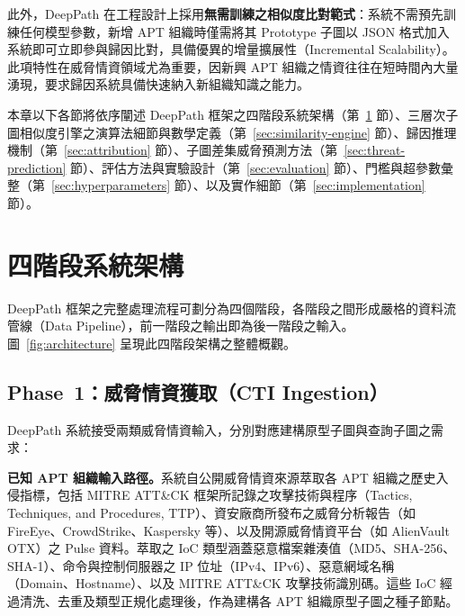 \begin{ZhChapter}
此外，DeepPath 在工程設計上採用\textbf{無需訓練之相似度比對範式}：系統不需預先訓練任何模型參數，新增 APT 組織時僅需將其 Prototype 子圖以 JSON 格式加入系統即可立即參與歸因比對，具備優異的增量擴展性（Incremental Scalability）。此項特性在威脅情資領域尤為重要，因新興 APT 組織之情資往往在短時間內大量湧現，要求歸因系統具備快速納入新組織知識之能力。

本章以下各節將依序闡述 DeepPath 框架之四階段系統架構（第~\ref{sec:four-phases} 節）、三層次子圖相似度引擎之演算法細節與數學定義（第~\ref{sec:similarity-engine} 節）、歸因推理機制（第~\ref{sec:attribution} 節）、子圖差集威脅預測方法（第~\ref{sec:threat-prediction} 節）、評估方法與實驗設計（第~\ref{sec:evaluation} 節）、門檻與超參數彙整（第~\ref{sec:hyperparameters} 節）、以及實作細節（第~\ref{sec:implementation} 節）。


\section{四階段系統架構}
\label{sec:four-phases}

DeepPath 框架之完整處理流程可劃分為四個階段，各階段之間形成嚴格的資料流管線（Data Pipeline），前一階段之輸出即為後一階段之輸入。圖~\ref{fig:architecture} 呈現此四階段架構之整體概觀。


\subsection{Phase~1：威脅情資獲取（CTI Ingestion）}
\label{subsec:phase1}

DeepPath 系統接受兩類威脅情資輸入，分別對應建構原型子圖與查詢子圖之需求：

\textbf{已知 APT 組織輸入路徑。}系統自公開威脅情資來源萃取各 APT 組織之歷史入侵指標，包括 MITRE ATT\&CK 框架所記錄之攻擊技術與程序（Tactics, Techniques, and Procedures, TTP）、資安廠商所發布之威脅分析報告（如 FireEye、CrowdStrike、Kaspersky 等）、以及開源威脅情資平台（如 AlienVault OTX）之 Pulse 資料。萃取之 IoC 類型涵蓋惡意檔案雜湊值（MD5、SHA-256、SHA-1）、命令與控制伺服器之 IP 位址（IPv4、IPv6）、惡意網域名稱（Domain、Hostname）、以及 MITRE ATT\&CK 攻擊技術識別碼。這些 IoC 經過清洗、去重及類型正規化處理後，作為建構各 APT 組織原型子圖之種子節點。


\end{ZhChapter}
